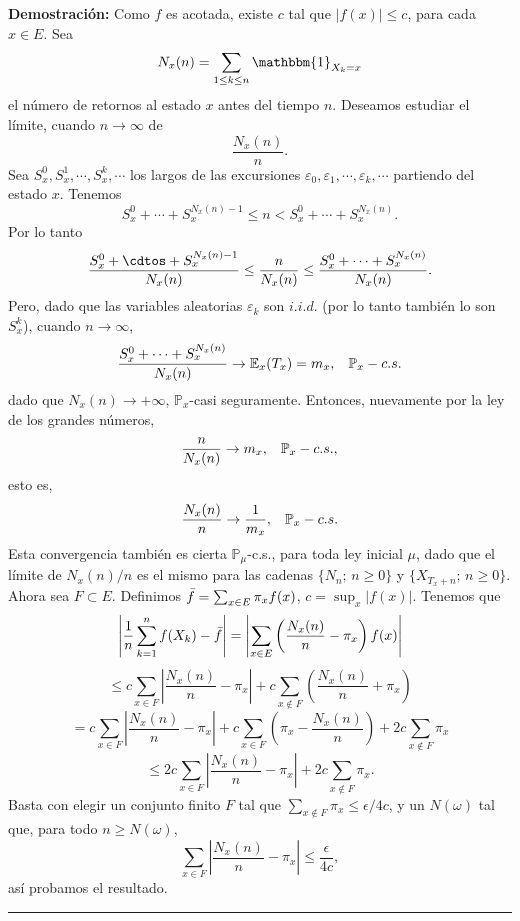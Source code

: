 \documentclass[a4paper]{article}
\newcommand{\prob}{\mathbb{P}}
\numberwithin{equation}{subsection}
\def\E{\mathbb E}
\begin{document}
\textbf{Demostración: }Como $f$ es acotada, existe $c$ tal que $|f(x)|\leq c$, para cada $x\in E$. Sea
\[N_x(n) = \sum_{1\leq k\leq n}\mathbbm{1}_{X_k=x}\]
el número de retornos al estado $x$ antes del tiempo $n$. Deseamos estudiar el límite, cuando $n\rightarrow \infty$ de
\[\frac{N_x(n)}{n}.\]
Sea $S_x^0,S_x^1,\cdots,S_x^k,\cdots$ los largos de las excursiones $\varepsilon_0,\varepsilon_1,\cdots, \varepsilon_k,\cdots$ partiendo del estado $x$. Tenemos
\[S_x^0 + \cdots + S_x^{N_x(n)-1}\leq n < S_x^0+\cdots + S_x^{N_x(n)}.\]
Por lo tanto
\[\frac{S_x^0 + \cdtos + S_x^{N_x(n)-1}}{N_x(n)}\leq \frac{n}{N_x(n)}\leq \frac{S_x^0 + \cdots + S_x^{N_x(n)}}{N_x(n)}.\]
Pero, dado que las variables aleatorias $\varepsilon_k$ son $i.i.d.$ (por lo tanto también lo son $S_x^k$), cuando $n\rightarrow \infty$,
\[\frac{S_x^0+\cdots+ S_x^{N_x(n)}}{N_x(n)} \rightarrow \E_x(T_x) = m_x,\hspace{0.3cm}\prob_x-c.s.\]
dado que $N_x(n)\rightarrow +\infty$, $\prob_x$-casi seguramente. Entonces, nuevamente por la ley de los grandes números,
\[\frac{n}{N_x(n)}\rightarrow m_x,\hspace{0.3cm}\prob_x-c.s.,\]
esto es,
\[\frac{N_x(n)}{n}\rightarrow\frac{1}{m_x},\hspace{0.3cm}\prob_x-c.s.\]
Esta convergencia también es cierta $\prob_{\mu}$-c.s., para toda ley inicial $\mu$, dado que el límite de $N_x(n)/n$ es el mismo para las cadenas $\{N_n;\,n\geq 0\}$ y $\{X_{T_x+n};\,n\geq 0\}$.\\ \newline
Ahora sea $F\subset E$. Definimos $\Bar{f} = \sum_{x\in E}\pi_xf(x)$, $c=\sup_x|f(x)|$. Tenemos que
\[\left| \frac{1}{n}\sum_{k=1}^n f(X_k) - \Bar{f}\right| = \left| \sum_{x\in E}\left(\frac{N_x(n)}{n}-\pi_x\right)f(x)\right|\]
\[\leq c\sum_{x\in F}\left|\frac{N_x(n)}{n}-\pi_x\right| + c\sum_{x\notin F}\left(\frac{N_x(n)}{n} + \pi_x\right)\]
\[= c\sum_{x\in F}\left|\frac{N_x(n)}{n} -\pi_x\right| + c\sum_{x\in F}\left(\pi_x - \frac{N_x(n)}{n}\right) + 2c\sum_{x \notin F}\pi_x\]
\[\leq 2c \sum_{x \in F}\left| \frac{N_x(n)}{n}-\pi_x\right| + 2c\sum_{x \notin F}\pi_x.\]
Basta con elegir un conjunto finito $F$ tal que $\sum_{x \notin F}\pi_x\leq \epsilon/4c$, y un $N(\omega)$ tal que, para todo $n\geq N(\omega)$,
\[\sum_{x\in F}\left|\frac{N_x(n)}{n}-\pi_x\right| \leq \frac{\epsilon}{4c},\]
así probamos el resultado.\\
\rule{0.7em}{0.7em}\\ \newline
\end{document}
